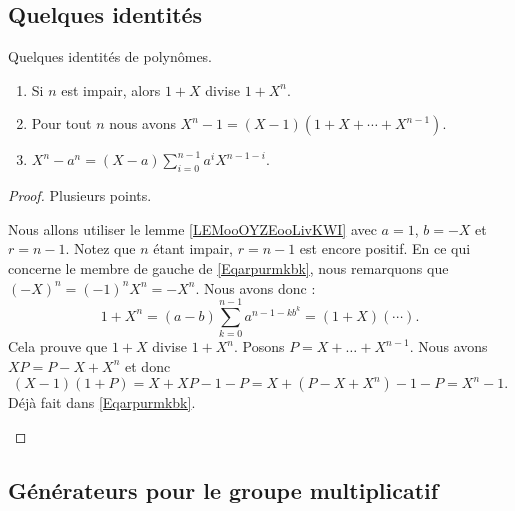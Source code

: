 \subsection{Quelques identités}

\begin{lemma}   \label{LemISPooHIKJBU}
	Quelques identités de polynômes.
	\begin{enumerate}
		\item   \label{ItemLTBooAcyMtN}
		      Si \( n\) est impair, alors \( 1+X\) divise \( 1+X^n\).
		      \item\label{ItemLTBooAcyMtNii}
		      Pour tout \( n\) nous avons \( X^n-1=(X-1)(1+X+\cdots +X^{n-1})\).
		\item       \label{ITEMooILIVooHtmWLm}
		      \( X^n-a^n=(X-a)\sum_{i=0}^{n-1}a^iX^{n-1-i}\).
	\end{enumerate}
\end{lemma}

\begin{proof}
	Plusieurs points.
	\begin{subproof}
		Nous allons utiliser le lemme \ref{LEMooOYZEooLivKWI} avec \( a=1\), \( b=-X\) et \( r=n-1\). Notez que \( n\) étant impair, \( r=n-1\) est encore positif. En ce qui concerne le membre de gauche de \eqref{Eqarpurmkbk}, nous remarquons que \( (-X)^n=(-1)^nX^n=-X^n\). Nous avons donc :
		\begin{equation}
			1+X^n=(a-b)\sum_{k=0}^{n-1}a^{n-1-kb^k}=(1+X)(\cdots).
		\end{equation}
		Cela prouve que \( 1+X\) divise \( 1+X^n\).
		Posons \( P=X+\ldots +X^{n-1}\). Nous avons \( XP=P-X+X^n\) et donc
		\begin{equation}
			(X-1)(1+P)=X+XP-1-P
			=X+(P-X+X^n)-1-P
			=X^n-1.
		\end{equation}
		Déjà fait dans \eqref{Eqarpurmkbk}.
	\end{subproof}
\end{proof}

\subsection{Générateurs pour le groupe multiplicatif}

